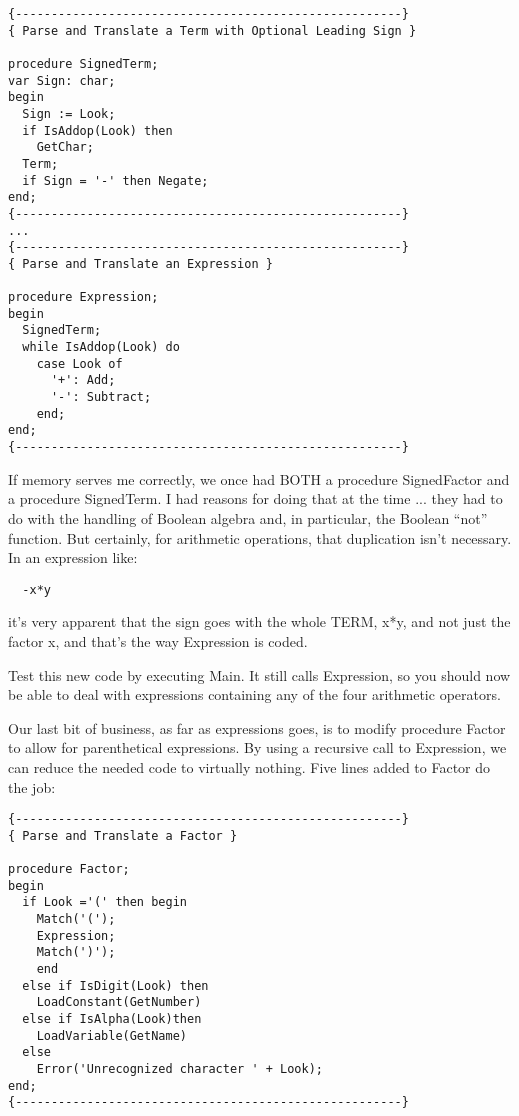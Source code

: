 \begin{verbatim}
{------------------------------------------------------}
{ Parse and Translate a Term with Optional Leading Sign }

procedure SignedTerm;
var Sign: char;
begin
  Sign := Look;
  if IsAddop(Look) then
    GetChar;
  Term;
  if Sign = '-' then Negate;
end;
{------------------------------------------------------}
...
{------------------------------------------------------}
{ Parse and Translate an Expression }

procedure Expression;
begin
  SignedTerm;
  while IsAddop(Look) do
    case Look of
      '+': Add;
      '-': Subtract;
    end;
end;
{------------------------------------------------------}
\end{verbatim}

If memory serves me correctly, we once had BOTH a procedure SignedFactor and a procedure SignedTerm. I had reasons for doing that at the time ... they had to do with the handling of Boolean algebra and, in particular, the Boolean ``not'' function. But certainly, for arithmetic operations, that duplication isn't necessary. In an expression like:

\begin{verbatim}
  -x*y
\end{verbatim}

it's very apparent that the sign goes with the whole TERM, x*y, and not just the factor x, and that's the way Expression is coded.

Test this new code by executing Main. It still calls Expression, so you should now be able to deal with expressions containing any of the four arithmetic operators.

Our last bit of business, as far as expressions goes, is to modify procedure Factor to allow for parenthetical expressions. By using a recursive call to Expression, we can reduce the needed code to virtually nothing. Five lines added to Factor do the job:

\begin{verbatim}
{------------------------------------------------------}
{ Parse and Translate a Factor }

procedure Factor;
begin
  if Look ='(' then begin
    Match('(');
    Expression;
    Match(')');
    end
  else if IsDigit(Look) then
    LoadConstant(GetNumber)
  else if IsAlpha(Look)then
    LoadVariable(GetName)
  else
    Error('Unrecognized character ' + Look);
end;
{------------------------------------------------------}
\end{verbatim}


